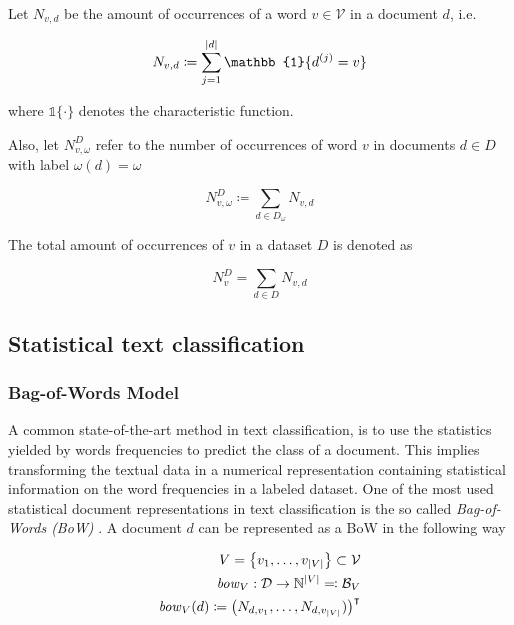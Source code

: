 Let $N_{v,d}$ be the amount of occurrences of a word $v \in \mathcal{V}$ in a
document $d$, i.e.

\begin{equation*}
N_{v,d} \coloneqq \sum\limits_{j=1}^{|d|} \mathbb{1}\{d^{(j)} = v\} \\
\end{equation*}

where $\mathbb{1}\{\cdot\}$ denotes the characteristic function.

Also, let $N_{v,\omega}^D$ refer to the number of occurrences of word $v$ 
in documents $d \in D$ with label $\omega(d) = \omega$

\begin{equation*}
N_{v,\omega}^D \coloneqq \sum\limits_{d \in D_\omega} N_{v,d}
\end{equation*}

The total amount of occurrences of $v$ in a dataset $D$ is denoted as 

\begin{equation*}
	N_v^D = \sum\limits_{d \in D} N_{v,d}
\end{equation*}

\subsection{Statistical text classification}
\label{sec:statistical-tc}

\subsubsection{Bag-of-Words Model}
A common state-of-the-art method in text classification, is to use the
statistics yielded by words frequencies to predict the class of a document.
This implies transforming the textual data in a numerical representation
containing statistical information on the word frequencies in a labeled dataset.
One of the most used statistical document representations in text classification is the so called
\emph{Bag-of-Words (BoW)} \cite{mccallum1998comparison, Joachims1998}.
A document $d$ can be represented as a BoW in the following way

\begin{equation*}
\begin{split}
V = \left\{ v_1, \ldots, v_{|V|} \right\} \subset \mathcal{V} \\
\mathit{bow}_V: \mathcal{D} \to \mathbb{N}^{|V|} \eqqcolon \mathcal{B}_V \\
\mathit{bow}_V(d) \coloneqq \left(N_{d,v_1},  \ldots,
N_{d,v_{|V|}})\right)^\intercal
\end{split}
\end{equation*}

